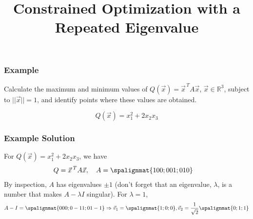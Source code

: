 \title{Constrained Optimization with a Repeated Eigenvalue}
\subtitle{\SubTitleName}
\institute[]{\Course}
\author{\Instructor}
\maketitle   
   


\begin{frame}\frametitle{Example}

    Calculate the maximum and minimum values of $Q(\vec x) = \vec x^{\, T}A \vec x$, $\vec x \in \mathbb R^3$, subject to $||\vec x|| = 1$, and identify points where these values are obtained. 
    
    $$Q(\vec x) = x_1^2 + 2x_2x_3$$
\end{frame}
    
\begin{frame}\frametitle{Example Solution}
    
    For $Q(\vec x) = x_1^2 + 2x_2x_3$, we have
    \begin{align*}
        Q &= \vec x \, ^T A\vec x,\quad A = \spalignmat{1 0 0;0 0 1;0 1 0} 
    \end{align*}
    \pause By inspection, $A$ has eigenvalues $\pm 1$ (don't forget that an eigenvalue, $\lambda$, is a number that makes $A - \lambda I$ singular). For $\lambda = 1$, 
    \pause 
    \begin{align*}
        A-I = \spalignmat{0 0 0;0 -1 1;0 1 -1} \Rightarrow \vec v_1 = \spalignmat{1;0;0}, \vec v_2 = \frac{1}{\sqrt2}\spalignmat{0;1;1}
    \end{align*}
\end{frame}
    
